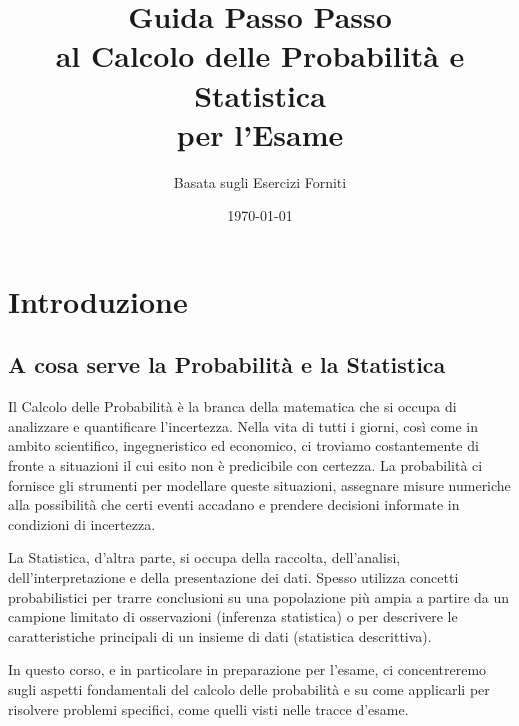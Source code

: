 \documentclass[12pt,a4paper]{article}
\title{Guida Passo Passo \\ al Calcolo delle Probabilità e Statistica \\ per l'Esame}
\author{Basata sugli Esercizi Forniti}
\date{\today}
\begin{document}
\newcommand{\R}{\mathbb{R}}
\newcommand{\N}{\mathbb{N}}
\newcommand{\Z}{\mathbb{Z}}
\newcommand{\E}{\mathbb{E}}
\newcommand{\Prob}{\mathbb{P}}
\newcommand{\Var}{\mathrm{Var}}
\newcommand{\Cov}{\mathrm{Cov}}
\newcommand{\dd}{\mathrm{d}} %

\newtheorem{theorem}{Teorema}[section]
\newtheorem{lemma}[theorem]{Lemma}
\newtheorem{proposition}[theorem]{Proposizione}
\newtheorem{corollary}[theorem{Corollario}
\newtheorem{definition}[theorem]{Definizione}
\newtheorem{example}[theorem]{Esempio}
\newtheorem{remark}[theorem]{Osservazione}
\newenvironment{proof}[1][Dimostrazione]{\begin{trivlist}
\item[\hskip \labelsep {\bfseries #1}]}{\end{trivlist}} %

\maketitle
\tableofcontents
\newpage

\chapter{Introduzione}
\section{A cosa serve la Probabilità e la Statistica}
Il Calcolo delle Probabilità è la branca della matematica che si occupa di analizzare e quantificare l'incertezza. Nella vita di tutti i giorni, così come in ambito scientifico, ingegneristico ed economico, ci troviamo costantemente di fronte a situazioni il cui esito non è predicibile con certezza. La probabilità ci fornisce gli strumenti per modellare queste situazioni, assegnare misure numeriche alla possibilità che certi eventi accadano e prendere decisioni informate in condizioni di incertezza.

La Statistica, d'altra parte, si occupa della raccolta, dell'analisi, dell'interpretazione e della presentazione dei dati. Spesso utilizza concetti probabilistici per trarre conclusioni su una popolazione più ampia a partire da un campione limitato di osservazioni (inferenza statistica) o per descrivere le caratteristiche principali di un insieme di dati (statistica descrittiva).

In questo corso, e in particolare in preparazione per l'esame, ci concentreremo sugli aspetti fondamentali del calcolo delle probabilità e su come applicarli per risolvere problemi specifici, come quelli visti nelle tracce d'esame.
\end{document}
